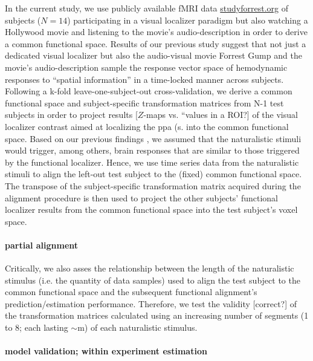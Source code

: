 In the current study, we use publicly available fMRI data
\href{www.studyforrest.org}{studyforrest.org} of subjects ($N=14$) participating
in a visual localizer paradigm \citep{sengupta2016extension} but also watching a
Hollywood \citep{hanke2016simultaneous} movie and listening to the movie's
audio-description \citep{hanke2014audiomovie} in order to derive a common
functional space.
%
Results of our previous study suggest \citep{haeusler2022processing} that not
just a dedicated visual localizer but also the audio-visual movie Forrest Gump
and the movie's audio-description sample the response vector space of
hemodynamic responses to ``spatial information'' in a time-locked manner across
subjects.
%
Following a k-fold leave-one-subject-out cross-validation, we derive a common
functional space and subject-specific transformation matrices from N-1 test
subjects in order to project results [$Z$-maps vs. ``values in a ROI?] of the
visual localizer contrast aimed at localizing the \ac{ppa} (s.
\citet{sengupta2016extension} into the common functional space.
Based on our previous findings \citep{haeusler2022processing}, we assumed that
the naturalistic stimuli would trigger, among others, brain responses that are
similar to those triggered by the functional localizer.
%
Hence, we use time series data from the naturalistic stimuli to align the
left-out test subject to the (fixed) common functional space.
The transpose of the subject-specific transformation matrix acquired during the
alignment procedure is then used to project the other subjects' functional
localizer results from the common functional space into the test subject's voxel
space.


\paragraph{partial alignment}

%
Critically, we also asses the relationship between the length of the
naturalistic stimulus (i.e. the quantity of data samples) used to align the test
subject to the common functional space and the subsequent functional alignment's
prediction/estimation performance.
%
Therefore, we test the validity [correct?] of the transformation matrices
calculated using an increasing number of segments (1 to 8; each lasting
$\sim$\unit[15]{m}) of each naturalistic stimulus.


\paragraph{model validation; within experiment estimation}

